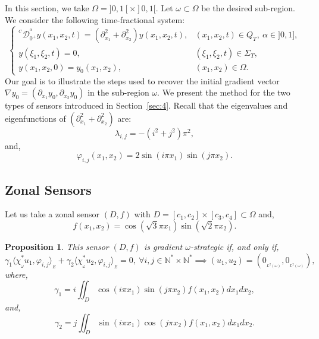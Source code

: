 \documentclass{article}
\newtheorem{proposition}[theorem]{Proposition}
\begin{document}
In this section, we take $\Omega = ]0,1[\times]0,1[$. 
Let $\omega\subset\Omega$ be the desired sub-region. 
We consider the following time-fractional system:
\begin{equation}
\label{sys.app}
\left\{\begin{array}{llll}
^{^C}\mathcal{D}_{0^+}^{^\alpha}y(x_1,x_2,t) 
=  \left(\partial_{x_1}^2 + \partial_{x_2}^2 \right)y(x_1,x_2,t),  
& (x_1,x_2,t)\in Q_T, \ \alpha\in]0,1],\\ 
y(\xi_1,\xi_2,t) = 0,  & (\xi_1,\xi_2,t)\in \Sigma_T, \\
y(x_1,x_2,0) = y_0(x_1,x_2), & (x_1,x_2)\in\Omega.
\end{array}\right.
\end{equation} 
Our goal is to illustrate the steps used to recover 
the initial gradient vector $\nabla y_0 = \left(\partial_{x_1}y_0, 
\partial_{x_2}y_0 \right)$ in the sub-region $\omega$. We present 
the method for the two types of sensors introduced in Section~\ref{sec:4}. 
Recall that the eigenvalues and eigenfunctions of 
$\left(\partial_{x_1}^2 + \partial_{x_2}^2 \right)$ are: 
$$
\lambda_{i,j} = -(i^2 + j^2)\pi^2,
$$
and,
$$
\varphi_{i,j}(x_1,x_2) = 2\sin(i\pi x_1)\sin(j\pi x_2).
$$ 


\subsection{Zonal Sensors}

Let us take a zonal sensor $(D,f)$
with $D = [c_1,c_2]\times[c_3,c_4] \subset \Omega$ and, 
$$
f(x_1,x_2) = \cos(\sqrt{3}\pi x_1)\sin(\sqrt{2}\pi x_2).
$$

\begin{proposition}
\label{prp.zon}
This sensor $(D,f)$ is gradient $\omega$-strategic if, and only if,  
$$
\gamma_1 \langle \chi_{_\omega}^*u_1,\varphi_{i,j}\rangle_{_{E}} 
+ \gamma_2 \langle \chi_{_\omega}^*u_2,\varphi_{i,j}\rangle_{_{E}}
= 0, \ \forall i,j\in \mathbb{N}^*\times\mathbb{N}^* 
\implies (u_1,u_2) = (0_{_{L^2(\omega)}},0_{_{L^2(\omega)}}),
$$
where,
$$
\gamma_1 = i\displaystyle\iint_{D}\cos(i\pi x_1)
\sin(j\pi x_2)f(x_1,x_2)dx_1dx_2,
$$
and,  
$$
\gamma_2 = j\displaystyle\iint_{D}\sin(i\pi x_1)
\cos(j\pi x_2)f(x_1,x_2)dx_1dx_2.
$$
\end{proposition}
\end{document}
